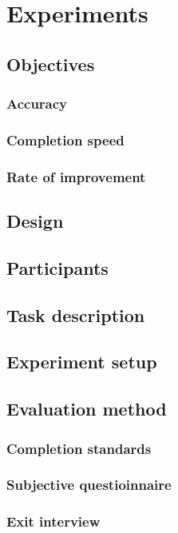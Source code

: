 \chapter{Experiments}
\label{ch:experiments}
\section{Objectives}
  \subsection{Accuracy}
  \subsection{Completion speed}
  \subsection{Rate of improvement}
\section{Design}
\section{Participants}
\section{Task description}
\section{Experiment setup}
\section{Evaluation method}
  \subsection{Completion standards}
  \subsection{Subjective questioinnaire}
  \subsection{Exit interview}
